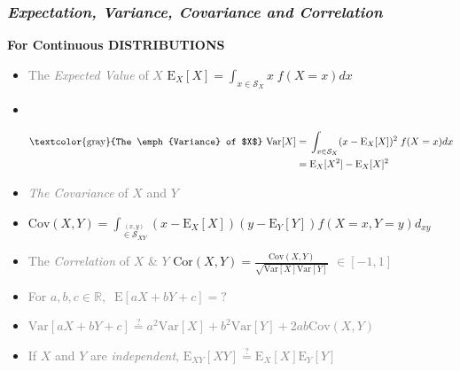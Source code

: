 \documentclass[xcolor={dvipsnames}]{beamer}
\begin{document}
\frame
{
 \frametitle{\emph{Expectation, Variance, Covariance and Correlation}}

\vspace{.75em}
\LARGE
\textbf{For Continuous DISTRIBUTIONS}
\small

\begin{itemize}
\item \textcolor{gray}{The \emph{Expected Value} of $X$} $\displaystyle \text{E}_X[X] = \int_{x \in \mathcal{S}_{X}} x\; f(X=x) dx$

\vspace{.3em}
\vspace{.5em}
\item  ${}$

\vspace{-3.5em}
\begin{align*}  
\text{\textcolor{gray}{The \emph{Variance} of $X$} Var}[X] = {} & \int_{x \in \mathcal{S}_{X}} (x-\text{E}_X[X])^2 \; f(X=x)dx \quad\quad \\
= {} & \text{E}_X[X^2] - \text{E}_X[X]^2 
\end{align*}

\vspace{.3em}

\vspace{-1em}
\item \textcolor{gray}{\emph{The Covariance} of $X$ and $Y$} 
\item[] $ \text{Cov}(X,Y) = \displaystyle \int_{\overset{(x,y)}{\in \mathcal{S}_{XY}}} (x-\text{E}_X[X])(y-\text{E}_Y[Y]) f(X=x,Y=y)d_{xy}$
\item \textcolor{gray}{The \emph{Correlation} of $X$ \& $Y$ } $\text{Cor}(X,Y) = \frac{\text{Cov}(X,Y)}{\sqrt{\text{Var}[X]\text{Var}[Y] }}$ \footnotesize \textcolor{gray}{$\in [-1, 1]$} \normalsize

\item \textcolor{gray}{For $a, b, c \in \mathbb{R}, \;\; \text{E}[aX+bY+c] = \text{?}$}
\item \textcolor{gray}{$\text{Var}[aX+bY+ c] \overset{?}{=} a^2\text{Var}[X] + b^2\text{Var}[Y] + 2ab \text{Cov}(X,Y)$}   
\item \textcolor{gray}{If $X$ and $Y$ are \emph{independent},  $\text{E}_{XY}[XY] \overset{?}{=} \text{E}_X[X]\text{E}_Y[Y]$}
\end{itemize}

}
\end{document}

